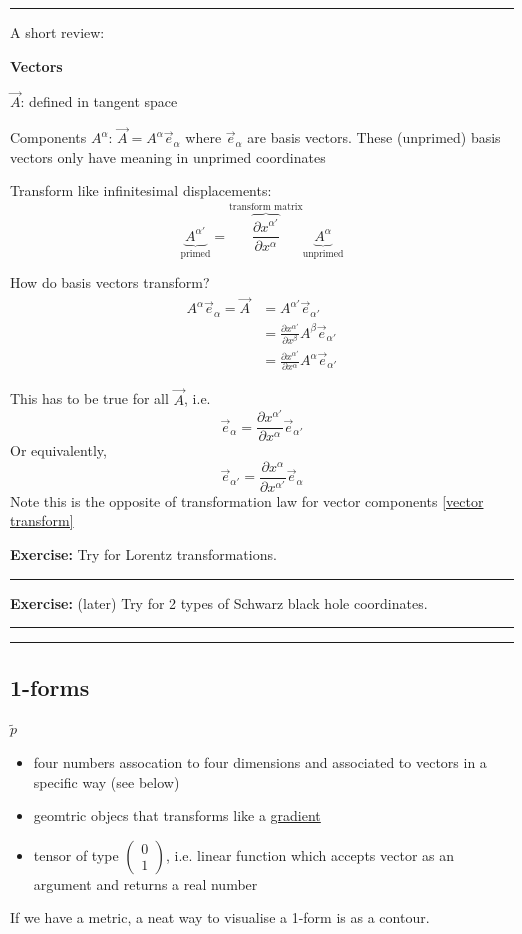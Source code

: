 \documentclass[a4paper]{article} %
\newcommand{\exercise}[2]
{
\begin{framed}
\textbf{Exercise:} #1 \\\hrule
#2
\end{framed}
}
\newcommand{\review}[1]
{
\hrule
A short review:

#1
\hrule
}
\newcommand{\pmx}[1]{
\begin{pmatrix}
#1
\end{pmatrix}
}
\begin{document}
\review{\textbf{Vectors}

$\vec{A}$: defined in tangent space

Components $A^\alpha$: $\vec{A}=A^\alpha \vec{e}_{\alpha}$ where $\vec{e}_{\alpha}$ are basis vectors. These (unprimed) basis vectors only have meaning in unprimed coordinates

Transform like infinitesimal displacements:
\begin{equation}
\underbrace{A^{\alpha'}}_{\text{primed}}=\overbrace{\frac{\partial x^{\alpha'}}{\partial x^{\alpha}}}^{\text{transform matrix}}\underbrace{A^{\alpha}}_{\text{unprimed}}\label{vector transform}
\end{equation}

How do basis vectors transform?
\begin{align*}
A^{\alpha}\vec{e}_\alpha=\vec{A}&=A^{\alpha'}\vec{e}_{\alpha'}\\
&=\frac{\partial x^{\alpha'}}{\partial x^{\beta}}A^{\beta}\vec{e}_{\alpha'}	\\
&=\frac{\partial x^{\alpha'}}{\partial x^{\alpha}}A^{\alpha}\vec{e}_{\alpha'}
\end{align*}

This has to be true for all $\vec{A}$, i.e.
\begin{equation}
\vec{e}_{\alpha}=\frac{\partial x^{\alpha'}}{\partial x^{\alpha}}\vec{e}_{\alpha'}
\end{equation}
Or equivalently,
\begin{equation}
\vec{e}_{\alpha'}=\frac{\partial x^{\alpha}}{\partial x^{\alpha'}}\vec{e}_{\alpha}
\end{equation}
Note this is the opposite of transformation law for vector components \ref{vector transform}

\exercise{Try for Lorentz transformations.}{}
\exercise{(later) Try for 2 types of Schwarz black hole coordinates.}{}

}

\subsection{1-forms}
$\widetilde{p}$
\begin{itemize}
\item four numbers assocation to four dimensions and associated to vectors in a specific way (see below)
\item geomtric objecs that transforms like a \underline{gradient}
\item tensor of type $\pmx{0\\1}$, i.e. linear function which accepts vector as an argument and returns a real number
\end{itemize}
If we have a metric, a neat way to visualise a 1-form is as a contour.
\end{document}
